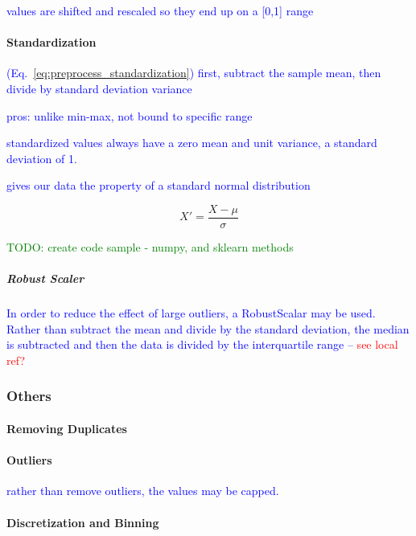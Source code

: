\textcolor{blue}{values are shifted and rescaled so they end up on a [0,1] range}

\paragraph{Standardization}

\textcolor{blue}{(Eq.~\ref{eq:preprocess_standardization}) first, subtract the sample mean, then divide by standard deviation variance}

\textcolor{blue}{pros: unlike min-max, not bound to specific range}

\textcolor{blue}{standardized values always have a zero mean and unit variance, a standard deviation of 1.}

\textcolor{blue}{gives our data the property of a standard normal distribution}

\begin{equation}
{X' = \frac{X - \mu}{\sigma}}
\label{eq:preprocess_standardization}
\end{equation}

\textcolor{green}{TODO: create code sample - numpy, and sklearn methods}

\subparagraph{Robust Scaler}

\textcolor{blue}{In order to reduce the effect of large outliers, a \textcolor{blue}{RobustScalar} may be used. Rather than subtract the mean and divide by the standard deviation, the median is subtracted and then the data is divided by the {interquartile range} -- \textcolor{red}{see local ref?}}


\subsubsection{Others}

\paragraph{Removing Duplicates}

\paragraph{Outliers}

\textcolor{blue}{rather than remove outliers, the values may be capped.}

\paragraph{Discretization and Binning}

